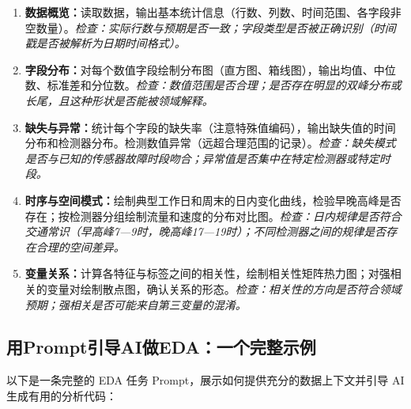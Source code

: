 \begin{enumerate}
  \item \textbf{数据概览：}读取数据，输出基本统计信息（行数、列数、时间范围、各字段非空数量）。\textit{检查：实际行数与预期是否一致；字段类型是否被正确识别（时间戳是否被解析为日期时间格式）。}
  \item \textbf{字段分布：}对每个数值字段绘制分布图（直方图、箱线图），输出均值、中位数、标准差和分位数。\textit{检查：数值范围是否合理；是否存在明显的双峰分布或长尾，且这种形状是否能被领域解释。}
  \item \textbf{缺失与异常：}统计每个字段的缺失率（注意特殊值编码），输出缺失值的时间分布和检测器分布。检测数值异常（远超合理范围的记录）。\textit{检查：缺失模式是否与已知的传感器故障时段吻合；异常值是否集中在特定检测器或特定时段。}
  \item \textbf{时序与空间模式：}绘制典型工作日和周末的日内变化曲线，检验早晚高峰是否存在；按检测器分组绘制流量和速度的分布对比图。\textit{检查：日内规律是否符合交通常识（早高峰7—9时，晚高峰17—19时）；不同检测器之间的规律是否存在合理的空间差异。}
  \item \textbf{变量关系：}计算各特征与标签之间的相关性，绘制相关性矩阵热力图；对强相关的变量对绘制散点图，确认关系的形态。\textit{检查：相关性的方向是否符合领域预期；强相关是否可能来自第三变量的混淆。}
\end{enumerate}

\subsection{用Prompt引导AI做EDA：一个完整示例}

以下是一条完整的 EDA 任务 Prompt，展示如何提供充分的数据上下文并引导 AI 生成有用的分析代码：

